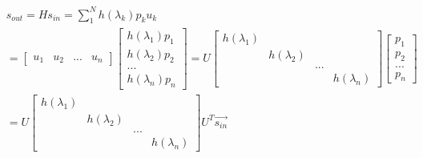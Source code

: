 \documentclass{article}
\begin{document}
\begin{align*}
    & s_{out} = H s_{in} = \sum_{1}^{N} h(\lambda_{k}) p_{k} u_{k}  \\[3pt]
    & = 
        \begin{bmatrix}
            u_{1} & u_{2} & ... & u_{n}
        \end{bmatrix}
        \begin{bmatrix}
            h \left ( \lambda_{1} \right ) p_{1} \\
            h \left ( \lambda_{2} \right ) p_{2} \\
            ... \\
            h \left ( \lambda_{n} \right ) p_{n}
        \end{bmatrix} 
      = 
        U
        \begin{bmatrix}
            h \left ( \lambda_{1} \right ) &  &  & \\
            &  h \left ( \lambda_{2} \right ) &  & \\
            &  &  ... & \\
            &  &  & h \left ( \lambda_{n} \right )
        \end{bmatrix}
        \begin{bmatrix}
            p_{1} \\
            p_{2} \\
            ... \\
            p_{n}
        \end{bmatrix}  \\[3pt]
    & = 
        U
        \begin{bmatrix}
            h \left ( \lambda_{1} \right ) &  &  & \\
            &  h \left ( \lambda_{2} \right ) &  & \\
            &  &  ... & \\
            &  &  & h \left ( \lambda_{n} \right )
        \end{bmatrix}
        U^{T} \overrightarrow{s_{in}}  \\[3pt]
\end{align*}
\end{document}
